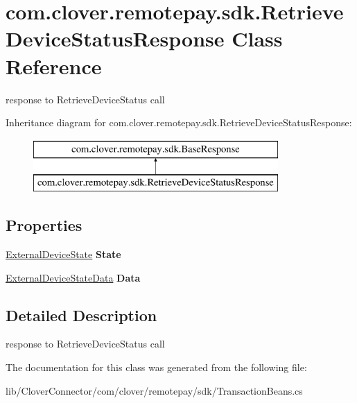\hypertarget{classcom_1_1clover_1_1remotepay_1_1sdk_1_1_retrieve_device_status_response}{}\section{com.\+clover.\+remotepay.\+sdk.\+Retrieve\+Device\+Status\+Response Class Reference}
\label{classcom_1_1clover_1_1remotepay_1_1sdk_1_1_retrieve_device_status_response}


response to Retrieve\+Device\+Status call  


Inheritance diagram for com.\+clover.\+remotepay.\+sdk.\+Retrieve\+Device\+Status\+Response\+:\begin{figure}[H]
\begin{center}
\leavevmode
\includegraphics[height=2.000000cm]{classcom_1_1clover_1_1remotepay_1_1sdk_1_1_retrieve_device_status_response}
\end{center}
\end{figure}
\subsection*{Properties}
\begin{DoxyCompactItemize}
\item 
\mbox{\label{classcom_1_1clover_1_1remotepay_1_1sdk_1_1_retrieve_device_status_response_a9e4bc4a0a7fa8c32d6201d6749589212}} 
\hyperlink{namespacecom_1_1clover_1_1remotepay_1_1sdk_a9d5838a91e2711306ad561d104fed034}{External\+Device\+State} {\bfseries State}
\item 
\mbox{\label{classcom_1_1clover_1_1remotepay_1_1sdk_1_1_retrieve_device_status_response_ade87936ceacda060e9cf0eff839feccb}} 
\hyperlink{classcom_1_1clover_1_1remotepay_1_1sdk_1_1_external_device_state_data}{External\+Device\+State\+Data} {\bfseries Data}
\end{DoxyCompactItemize}


\subsection{Detailed Description}
response to Retrieve\+Device\+Status call 



The documentation for this class was generated from the following file\+:\begin{DoxyCompactItemize}
\item 
lib/\+Clover\+Connector/com/clover/remotepay/sdk/Transaction\+Beans.\+cs\end{DoxyCompactItemize}
